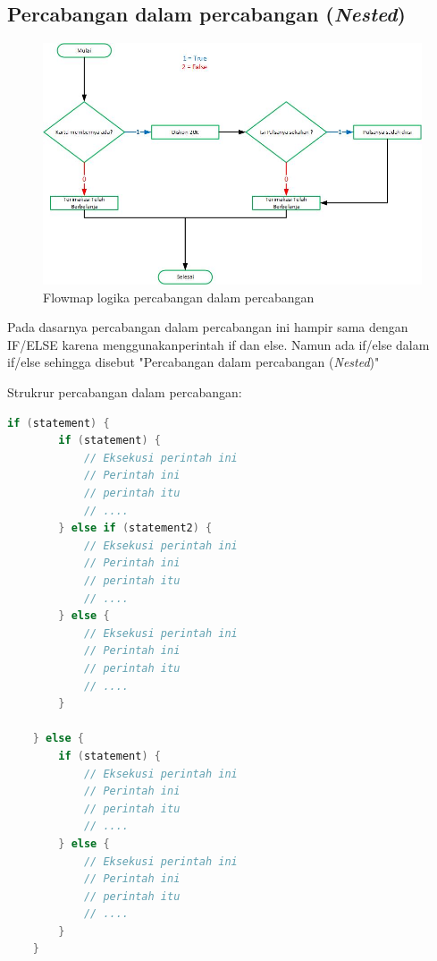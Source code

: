 \subsection{Percabangan dalam percabangan (\textit{Nested})}
\begin{figure}[h!]
    \centering
    \includegraphics[scale=0.5]{pictures/flowmap_percabangan_dalam_percabangan.jpg}
    \caption{Flowmap logika percabangan dalam percabangan}
    \label{}
\end{figure}
Pada dasarnya percabangan dalam percabangan ini hampir sama dengan IF/ELSE karena menggunakanperintah \textcolor{pred}{if} dan \textcolor{pred}{else}. Namun ada if/else dalam if/else sehingga disebut "Percabangan dalam percabangan (\textit{Nested})"

Strukrur percabangan dalam percabangan:
\begin{lstlisting}[language=Java]
if (statement) {
        if (statement) {
            // Eksekusi perintah ini
            // Perintah ini
            // perintah itu
            // ....
        } else if (statement2) {
            // Eksekusi perintah ini
            // Perintah ini
            // perintah itu
            // ....
        } else {
            // Eksekusi perintah ini
            // Perintah ini
            // perintah itu
            // ....
        }

    } else {
        if (statement) {
            // Eksekusi perintah ini
            // Perintah ini
            // perintah itu
            // ....
        } else {
            // Eksekusi perintah ini
            // Perintah ini
            // perintah itu
            // ....
        }
    }
\end{lstlisting}

\medskip

